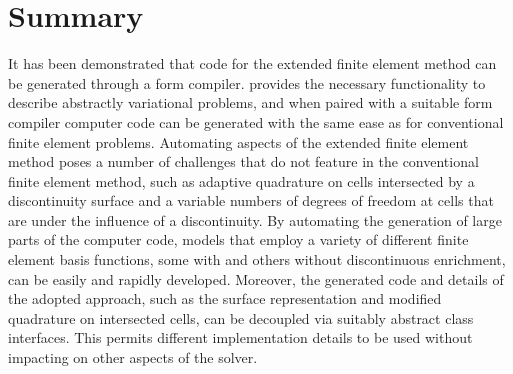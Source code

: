 \section{Summary}

It has been demonstrated that code for the extended finite element method
can be generated through a form compiler. \ufl{} provides the necessary
functionality to describe abstractly variational problems, and when paired
with a suitable form compiler computer code can be generated with the same
ease as for conventional finite element problems.  Automating aspects of
the extended finite element method poses a number of challenges that do
not feature in the conventional finite element method, such as adaptive
quadrature on cells intersected by a discontinuity surface and a variable
numbers of degrees of freedom at cells that are under the influence
of a discontinuity. By automating the generation of large parts of the
computer code, models that employ a variety of different finite element
basis functions, some with and others without discontinuous enrichment,
can be easily and rapidly developed.  Moreover, the generated code and
details of the adopted approach, such as the surface representation and
modified quadrature on intersected cells, can be decoupled via suitably
abstract class interfaces. This permits different implementation details
to be used without impacting on other aspects of the solver.
